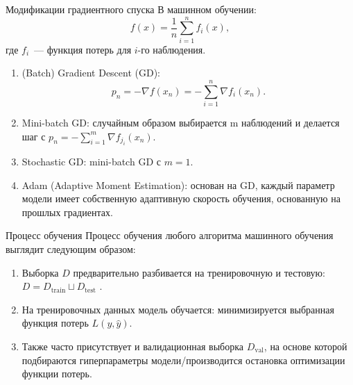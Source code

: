 \documentclass[notheorems, handout]{beamer}
\begin{document}
\begin{frame}{Модификации градиентного спуска}
	В машинном обучении:
	\[
		f(x)=\frac{1}{n}\sum_{i=1}^n f_i(x),
	\]
	где $f_i$~--- функция потерь для $i$-го наблюдения.\medskip
	\begin{enumerate}
		\item (Batch) Gradient Descent (GD):
		      \[
			      p_n=-\nabla f(x_n)=-\sum_{i=1}^n \nabla f_i(x_n).
		      \]
		\item Mini-batch GD: случайным образом выбирается \textsf{m} наблюдений и делается шаг с $p_n=-\sum_{i=1}^m \nabla f_{j_i}(x_n)$.\smallskip
		\item Stochastic GD: mini-batch GD с $m=1$.\smallskip
		\item Adam (Adaptive Moment Estimation): основан на GD, каждый параметр модели имеет собственную адаптивную скорость обучения, основанную на прошлых градиентах.
	\end{enumerate}
\end{frame}

\begin{frame}{Процесс обучения}
	Процесс обучения любого алгоритма машинного обучения выглядит следующим образом:
	\begin{enumerate}
		\item Выборка $D$ предварительно разбивается на тренировочную и тестовую: $D=D_\text{train} \sqcup D_\text{test}$ .\medskip
		\item На тренировочных данных модель обучается: минимизируется выбранная функция потерь $L(y, \hat y)$.\medskip
		\item Также часто присутствует и валидационная выборка $D_\text{val}$, на основе которой подбираются гиперпараметры модели/производится остановка оптимизации функции потерь.
	\end{enumerate}
\end{frame}
\end{document}
